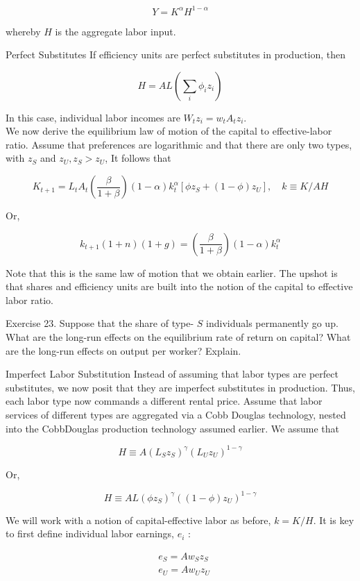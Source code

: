 \documentclass[10pt]{article}
\begin{document}
$$
Y=K^{\alpha} H^{1-\alpha}
$$

whereby $H$ is the aggregate labor input.

Perfect Substitutes If efficiency units are perfect substitutes in production, then

$$
H=A L\left(\sum_{i} \phi_{i} z_{i}\right)
$$

In this case, individual labor incomes are $W_{t} z_{i}=w_{t} A_{t} z_{i}$.\\
We now derive the equilibrium law of motion of the capital to effective-labor ratio. Assume that preferences are logarithmic and that there are only two types, with $z_{S}$ and $z_{U}, z_{S}>z_{U}$, It follows that

$$
K_{t+1}=L_{t} A_{t}\left(\frac{\beta}{1+\beta}\right)(1-\alpha) k_{t}^{\alpha}\left[\phi z_{S}+(1-\phi) z_{U}\right], \quad k \equiv K / A H
$$

Or,

$$
k_{t+1}(1+n)(1+g)=\left(\frac{\beta}{1+\beta}\right)(1-\alpha) k_{t}^{\alpha}
$$

Note that this is the same law of motion that we obtain earlier. The upshot is that shares and efficiency units are built into the notion of the capital to effective labor ratio.

Exercise 23. Suppose that the share of type- $S$ individuals permanently go up. What are the long-run effects on the equilibrium rate of return on capital? What are the long-run effects on output per worker? Explain.

Imperfect Labor Substitution Instead of assuming that labor types are perfect substitutes, we now posit that they are imperfect substitutes in production. Thus, each labor type now commands a different rental price. Assume that labor services of different types are aggregated via a Cobb Douglas technology, nested into the CobbDouglas production technology assumed earlier. We assume that

$$
H \equiv A\left(L_{S} z_{S}\right)^{\gamma}\left(L_{U} z_{U}\right)^{1-\gamma}
$$

Or,

$$
H \equiv A L\left(\phi z_{S}\right)^{\gamma}\left((1-\phi) z_{U}\right)^{1-\gamma}
$$

We will work with a notion of capital-effective labor as before, $k=K / H$. It is key to first define individual labor earnings, $e_{i}$ :

$$
\begin{aligned}
& e_{S}=A w_{S} z_{S} \\
& e_{U}=A w_{U} z_{U}
\end{aligned}
$$
\end{document}
